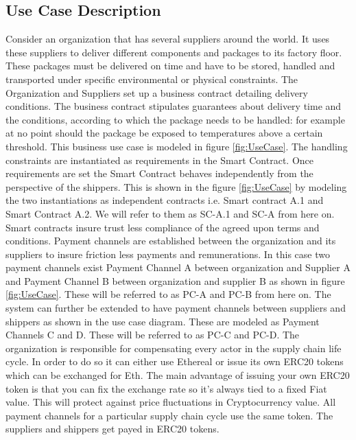 \subsection{Use Case Description} \label{ST-Dapp-UC} 
Consider an organization that has several suppliers around the world. It uses these suppliers to deliver different components and packages to its factory floor. These packages must be delivered on time and have to be stored, handled and transported under specific environmental or physical constraints. The Organization and Suppliers set up a business contract detailing delivery conditions. The business contract stipulates guarantees about delivery time and the conditions, according to which the package needs to be handled: for example at no point should the package be exposed to temperatures above a certain threshold.  This business use case is modeled in figure \ref{fig:UseCase}. The handling constraints are instantiated as requirements in the Smart Contract. Once requirements are set the Smart Contract behaves independently from the perspective of the shippers. This is shown in the figure \ref{fig:UseCase} by modeling the two instantiations as independent contracts i.e. Smart contract A.1 and Smart Contract A.2. We will refer to them as SC-A.1 and SC-A from here on. Smart contracts insure trust less compliance of the agreed upon terms and conditions. Payment channels are established between the organization and its suppliers to insure friction less payments and remunerations. In this case two payment channels exist Payment Channel A between organization and Supplier A and Payment Channel B between organization and supplier B as shown in figure \ref{fig:UseCase}. These will be referred to as PC-A and PC-B from here on. The system can further be extended to have payment channels between suppliers and shippers as shown in the use case diagram. These are modeled as Payment Channels C and D. These will be referred to as PC-C and PC-D. The organization is responsible for compensating every actor in the supply chain life cycle. In order to do so it can either use Ethereal or issue its own ERC20 tokens which can be exchanged for Eth. The main advantage of issuing your own ERC20 token is that you can fix the exchange rate so it’s always tied to a fixed Fiat value. This will protect against price fluctuations in Cryptocurrency value. All payment channels for a particular supply chain cycle use the same token. The suppliers and shippers get payed in ERC20 tokens.
